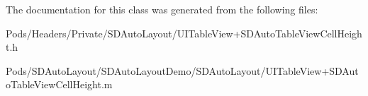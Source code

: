 The documentation for this class was generated from the following files\+:\begin{DoxyCompactItemize}
\item 
Pods/\+Headers/\+Private/\+S\+D\+Auto\+Layout/U\+I\+Table\+View+\+S\+D\+Auto\+Table\+View\+Cell\+Height.\+h\item 
Pods/\+S\+D\+Auto\+Layout/\+S\+D\+Auto\+Layout\+Demo/\+S\+D\+Auto\+Layout/U\+I\+Table\+View+\+S\+D\+Auto\+Table\+View\+Cell\+Height.\+m\end{DoxyCompactItemize}
